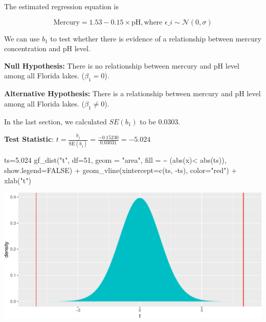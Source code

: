 \documentclass[
  letterpaper,
  DIV=11,
  numbers=noendperiod]{scrreprt}
\newenvironment{Shaded}{\begin{snugshade}}{\end{snugshade}}
\newcommand{\AttributeTok}[1]{\textcolor[rgb]{0.40,0.45,0.13}{#1}}
\newcommand{\ConstantTok}[1]{\textcolor[rgb]{0.56,0.35,0.01}{#1}}
\newcommand{\DecValTok}[1]{\textcolor[rgb]{0.68,0.00,0.00}{#1}}
\newcommand{\FloatTok}[1]{\textcolor[rgb]{0.68,0.00,0.00}{#1}}
\newcommand{\FunctionTok}[1]{\textcolor[rgb]{0.28,0.35,0.67}{#1}}
\newcommand{\NormalTok}[1]{\textcolor[rgb]{0.00,0.23,0.31}{#1}}
\newcommand{\OtherTok}[1]{\textcolor[rgb]{0.00,0.23,0.31}{#1}}
\newcommand{\SpecialCharTok}[1]{\textcolor[rgb]{0.37,0.37,0.37}{#1}}
\newcommand{\StringTok}[1]{\textcolor[rgb]{0.13,0.47,0.30}{#1}}
\begin{document}
The estimated regression equation is

\[
\text{Mercury} = 1.53 - 0.15 \times\text{pH}, \text{where } \epsilon\_i\sim\mathcal{N}(0, \sigma) 
\]

We can use \(b_1\) to test whether there is evidence of a relationship
between mercury concentration and pH level.

\textbf{Null Hypothesis:} There is no relationship between mercury and
pH level among all Florida lakes. (\(\beta_1=0\)).

\textbf{Alternative Hypothesis:} There is a relationship between mercury
and pH level among all Florida lakes. (\(\beta_1 \neq 0\)).

In the last section, we calculated \(SE(b_1)\) to be 0.0303.

\textbf{Test Statistic}:
\(t=\frac{{b_j}}{\text{SE}(b_j)} = \frac{-0.15230}{0.03031} = -5.024\)

\begin{Shaded}
\begin{Highlighting}[]
\NormalTok{ts}\OtherTok{=}\FloatTok{5.024}
\FunctionTok{gf\_dist}\NormalTok{(}\StringTok{"t"}\NormalTok{, }\AttributeTok{df=}\DecValTok{51}\NormalTok{, }\AttributeTok{geom =} \StringTok{"area"}\NormalTok{, }\AttributeTok{fill =} \SpecialCharTok{\textasciitilde{}}\NormalTok{ (}\FunctionTok{abs}\NormalTok{(x)}\SpecialCharTok{\textless{}} \FunctionTok{abs}\NormalTok{(ts)), }\AttributeTok{show.legend=}\ConstantTok{FALSE}\NormalTok{) }\SpecialCharTok{+} \FunctionTok{geom\_vline}\NormalTok{(}\AttributeTok{xintercept=}\FunctionTok{c}\NormalTok{(ts, }\SpecialCharTok{{-}}\NormalTok{ts), }\AttributeTok{color=}\StringTok{"red"}\NormalTok{)  }\SpecialCharTok{+} \FunctionTok{xlab}\NormalTok{(}\StringTok{"t"}\NormalTok{)}
\end{Highlighting}
\end{Shaded}

\includegraphics{Ch4_files/figure-pdf/unnamed-chunk-43-1.pdf}
\end{document}
